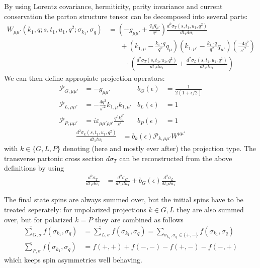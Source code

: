 By using Lorentz covariance, hermiticity, parity invariance and current conservation the parton structure tensor can be decomposed into several parts:
\begin{align}
W_{\mu\mu'}(k_1,q;s,t_1,u_1,q^2;\sigma_{k_1},\sigma_{q}) &= \left(-g_{\mu\mu'} + \frac{q_\mu q_{\mu'}}{q^2}\right)\frac{d^2\sigma_T(s,t_1,u_1,q^2)}{dt_1du_1} \nonumber\\
 &\hspace{20pt} +\left(k_{1,\mu}-\frac{k_1\cdot q}{q^2}q_\mu\right)\left(k_{1,\mu'}-\frac{k_1\cdot q}{q^2}q_{\mu'}\right)\left(\frac{-4q^2}{{s'}^2}\right) \nonumber\\
 &\hspace{30pt} \cdot\left(\frac{d^2\sigma_T(s,t_1,u_1,q^2)}{dt_1du_1}+\frac{d^2\sigma_L(s,t_1,u_1,q^2)}{dt_1du_1}\right)
\end{align}
We can then define appropiate projection operators\cite{Laenen1993162,Vogelsang:1993eg}:
\begin{align}
\mathcal P_{G,\mu\mu'} &= -g_{\mu\mu'} &b_G(\epsilon) &= \frac 1 {2(1+\epsilon/2)}\\
\mathcal P_{L,\mu\mu'} &= -\frac{4q^2}{{s'}^2} k_{1,\mu}k_{1,\mu'} &b_L(\epsilon) &= 1\\
\mathcal P_{P,\mu\mu'} &= i\varepsilon_{\mu\mu'\rho\rho'}\frac{q^{\rho}k_1^{\rho'}}{s'} &b_P(\epsilon) &= 1
\end{align}
\begin{align}
\frac{d^2\sigma_{k}(s,t_1,u_1,q^2)}{dt_1tu_1} &= b_k(\epsilon)\mathcal P_{k,\mu\mu'}W^{\mu\mu'}
\end{align}
with $k\in\{G,L,P\}$ denoting (here and mostly ever after) the projection type. The transverse partonic cross section $d\sigma_T$ can be reconstructed from the above definitions by using
\begin{align}
\frac{d^2\sigma_T}{dt_1du_1} &= \frac{d^2\sigma_G}{dt_1du_1} + b_G(\epsilon)\frac{d^2\sigma_L}{dt_1du_1}
\end{align}

The final state spins are always summed over, but the initial spins have to be treated seperately: for unpolarized projections $k\in{G,L}$ they are also summed over, but for polarized $k=P$ they are combined as follows
\begin{align}
\hat\sum_{G,\sigma} f(\sigma_{k_1},\sigma_q) &= \hat\sum_{L,\sigma} f(\sigma_{k_1},\sigma_q) =\sum_{\sigma_{k_1},\sigma_q\in\{+,-\}}f(\sigma_{k_1},\sigma_q)\\
\hat\sum_{P,\sigma} f(\sigma_{k_1},\sigma_q) &= f(+,+)+f(-,-)-f(+,-)-f(-,+)
\end{align}
which keeps spin asymmetries well behaving.

